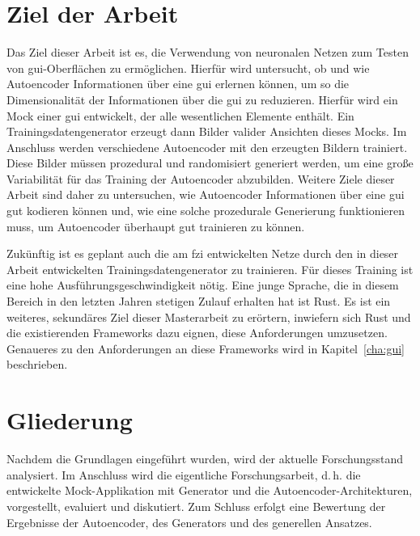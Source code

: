 \section{Ziel der Arbeit}
\label{sec:goal}
Das Ziel dieser Arbeit ist es, die Verwendung von neuronalen Netzen zum Testen von \gls{gui}-Oberflächen zu ermöglichen. Hierfür wird untersucht, ob und wie Autoencoder Informationen über eine \gls{gui} erlernen können, um so die Dimensionalität der Informationen über die \gls{gui} zu reduzieren. Hierfür wird ein Mock einer \gls{gui} entwickelt, der alle wesentlichen Elemente enthält. Ein Trainingsdatengenerator erzeugt dann Bilder valider Ansichten dieses Mocks. Im Anschluss werden verschiedene Autoencoder mit den erzeugten Bildern trainiert. Diese Bilder müssen prozedural und randomisiert generiert werden, um eine große Variabilität für das Training der Autoencoder abzubilden. Weitere Ziele dieser Arbeit sind daher zu untersuchen, wie Autoencoder Informationen über eine \gls{gui} gut kodieren können und, wie eine solche prozedurale Generierung funktionieren muss, um Autoencoder überhaupt gut trainieren zu können.

Zukünftig ist es geplant auch die am \gls{fzi} entwickelten Netze durch den in dieser Arbeit entwickelten Trainingsdatengenerator zu trainieren. Für dieses Training ist eine hohe Ausführungsgeschwindigkeit nötig. Eine junge Sprache, die in diesem Bereich in den letzten Jahren stetigen Zulauf erhalten hat ist Rust. Es ist ein weiteres, sekundäres Ziel dieser Masterarbeit zu erörtern, inwiefern sich Rust und die existierenden Frameworks dazu eignen, diese Anforderungen umzusetzen. Genaueres zu den Anforderungen an diese Frameworks wird in Kapitel~\ref{cha:gui} beschrieben.



\section{Gliederung}
Nachdem die Grundlagen eingeführt wurden, wird der aktuelle Forschungsstand analysiert. Im Anschluss wird die eigentliche Forschungsarbeit, d.\,h. die entwickelte Mock-Applikation mit Generator und die Autoencoder-Architekturen, vorgestellt, evaluiert und diskutiert. Zum Schluss erfolgt eine Bewertung der Ergebnisse der Autoencoder, des Generators und des generellen Ansatzes.
